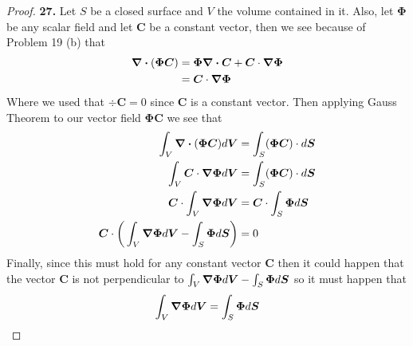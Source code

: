 \documentclass[11pt]{article}
\theoremstyle{definition}
\begin{document}
\cleardoublepage
\begin{proof}{\textbf{27.}}
    Let $S$ be a closed surface and $V$ the volume contained in it.
    Also, let $\bm{\Phi}$ be any scalar field and let $\bm{C}$ be a
    constant vector, then we see because of Problem 19 (b) that
    \begin{align*}
        \div (\bm{\Phi C}) &= \bm{\Phi} \div\bm{C} + \bm{C} \cdot \gradient \bm{\Phi}\\
            &= \bm{C} \cdot \gradient \bm{\Phi}
    \end{align*}
    Where we used that $\div\bm{C} = 0$ since $\bm{C}$ is a constant vector.
    Then applying Gauss Theorem to our vector field $\bm{\Phi C}$ we see that
    \begin{align*}
        \int_V \div(\bm{\Phi C}) d\bm{V} &= \int_S (\bm{\Phi C}) \cdot d\bm{S}\\
        \int_V \bm{C}\cdot\gradient\bm{\Phi} d\bm{V}
        &= \int_S (\bm{\Phi C}) \cdot d\bm{S}\\
        \bm{C}\cdot \int_V \gradient\bm{\Phi} d\bm{V}
        &= \bm{C}\cdot\int_S \bm{\Phi} d\bm{S}\\
        \bm{C}\cdot \bigg(\int_V \gradient\bm{\Phi} d\bm{V}
        - \int_S \bm{\Phi} d\bm{S}\bigg)
        &= 0
    \end{align*}
    Finally, since this must hold for any constant vector $\bm{C}$ then it
    could happen that the vector $\bm{C}$ is not perpendicular to
    $\int_V \gradient\bm{\Phi} d\bm{V} - \int_S \bm{\Phi} d\bm{S}$
    so it must happen that
    $$\int_V \gradient\bm{\Phi} d\bm{V} = \int_S \bm{\Phi} d\bm{S}$$
\end{proof}
\cleardoublepage
\end{document}
